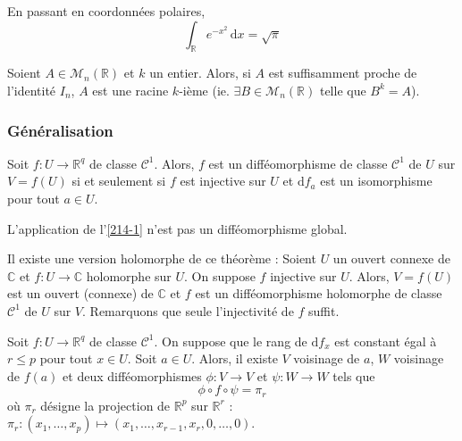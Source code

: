 	
	\begin{example}
		En passant en coordonnées polaires,
		\[ \int_{\mathbb{R}} e^{-x^2} \, \mathrm{d}x = \sqrt{\pi} \]
	\end{example}
	
	
	\begin{application}
		Soient $A \in \mathcal{M}_n(\mathbb{R})$ et $k$ un entier. Alors, si $A$ est suffisamment proche de l'identité $I_n$, $A$ est une racine $k$-ième (ie. $\exists B \in \mathcal{M}_n(\mathbb{R})$ telle que $B^k = A$).
	\end{application}
	
	\subsubsection{Généralisation}
	
	\begin{theorem}
		Soit $f : U \rightarrow \mathbb{R}^q$ de classe $\mathcal{C}^1$. Alors, $f$ est un difféomorphisme de classe $\mathcal{C}^1$ de $U$ sur $V = f(U)$ si et seulement si $f$ est injective sur $U$ et $\mathrm{d}f_a$ est un isomorphisme pour tout $a \in U$.
	\end{theorem}
	
	
	\begin{example}
		L'application de l'\cref{214-1} n'est pas un difféomorphisme global.
	\end{example}
	
	
	\begin{remark}
		Il existe une version holomorphe de ce théorème :
		\newpar
		Soient $U$ un ouvert connexe de $\mathbb{C}$ et $f : U \rightarrow \mathbb{C}$ holomorphe sur $U$. On suppose $f$ injective sur $U$. Alors, $V = f(U)$ est un ouvert (connexe) de $\mathbb{C}$ et $f$ est un difféomorphisme holomorphe de classe $\mathcal{C}^1$ de $U$ sur $V$.
		\newpar
		Remarquons que seule l'injectivité de $f$ suffit.
	\end{remark}
	
	
	\begin{theorem}
		Soit $f : U \rightarrow \mathbb{R}^q$ de classe $\mathcal{C}^1$. On suppose que le rang de $\mathrm{d}f_x$ est constant égal à $r \leq p$ pour tout $x \in U$. Soit $a \in U$. Alors, il existe $V$ voisinage de $a$, $W$ voisinage de $f(a)$ et deux difféomorphismes $\phi : V \rightarrow V$ et $\psi : W \rightarrow W$ tels que
		\[ \phi \circ f \circ \psi = \pi_r \]
		où $\pi_r$ désigne la projection de $\mathbb{R}^p$ sur $\mathbb{R}^r$ : $\pi_r : (x_1, \dots, x_p) \mapsto (x_1, \dots, x_{r-1}, x_r, 0, \dots, 0)$.
	\end{theorem}
	

